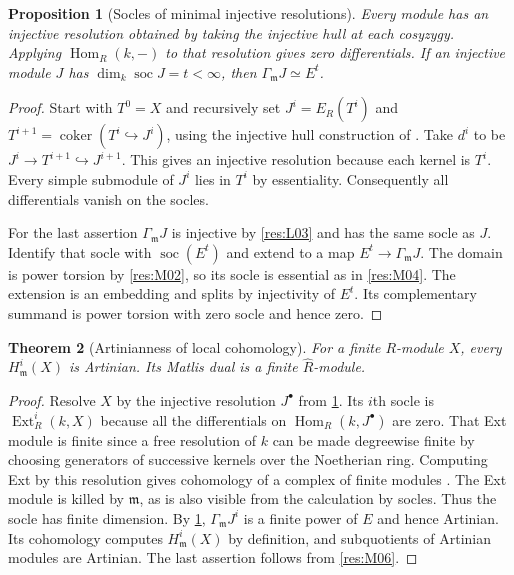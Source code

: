 \documentclass[11pt,oneside,openany]{book}
\newtheorem{theorem}{Theorem}[chapter]
\newtheorem{proposition}[theorem]{Proposition}
\theoremstyle{definition}
\theoremstyle{remark}
\begin{document}
\begin{proposition}[Socles of minimal injective resolutions]\label{res:M07}
Every module has an injective resolution obtained by taking the
injective hull at each cosyzygy. Applying $\operatorname{Hom}_R(k,-)$
to that resolution gives zero differentials. If an injective module
$J$ has $\dim_k\operatorname{soc}J=t<\infty$, then
$\Gamma_{\mathfrak m}J\simeq E^t$.
\end{proposition}
\begin{proof}
Start with $T^0=X$ and recursively set $J^i=E_R(T^i)$ and
$T^{i+1}=\operatorname{coker}(T^i\hookrightarrow J^i)$, using the
injective hull construction of \cite[ALG-03-C02-S03]{p103}.
Take $d^i$ to be $J^i\to T^{i+1}\hookrightarrow J^{i+1}$.
This gives an injective resolution because each kernel is $T^i$.
Every simple submodule of $J^i$ lies in $T^i$ by essentiality.
Consequently all differentials vanish on the socles.

For the last assertion $\Gamma_{\mathfrak m}J$ is injective by
\ref{res:L03} and has the same socle as $J$. Identify that socle with
$\operatorname{soc}(E^t)$ and extend to a map
$E^t\to \Gamma_{\mathfrak m}J$. The domain is power torsion by
\ref{res:M02}, so its socle is essential as in \ref{res:M04}.
The extension is an embedding and splits by injectivity of $E^t$.
Its complementary summand is power torsion with zero socle and hence
zero.
\end{proof}

\begin{theorem}[Artinianness of local cohomology]\label{res:M08}
For a finite $R$-module $X$, every $H^i_{\mathfrak m}(X)$ is Artinian.
Its Matlis dual is a finite $\widehat R$-module.
\end{theorem}
\begin{proof}
Resolve $X$ by the injective resolution $J^\bullet$ from
\ref{res:M07}. Its $i$th socle is $\operatorname{Ext}^i_R(k,X)$
because all the differentials on $\operatorname{Hom}_R(k,J^\bullet)$
are zero. That Ext module is finite since a free resolution of $k$
can be made degreewise finite by choosing generators of successive
kernels over the Noetherian ring. Computing Ext by this resolution
gives cohomology of a complex of finite modules
\cite[ALG-10-C03-R01 and S01]{p103}. The Ext module is killed by $\mathfrak m$,
as is also visible from the calculation by socles. Thus the socle
has finite dimension. By \ref{res:M07}, $\Gamma_{\mathfrak m}J^i$
is a finite power of $E$ and hence Artinian. Its cohomology computes
$H^i_{\mathfrak m}(X)$ by definition, and subquotients of Artinian
modules are Artinian. The last assertion follows from \ref{res:M06}.
\end{proof}
\end{document}
